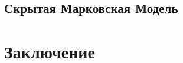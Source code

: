 \documentclass{matmex-diploma}
\begin{document}
\subsection{Скрытая Марковская Модель}

\section*{Заключение}



\end{document}
